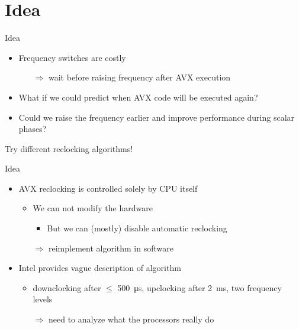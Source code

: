 \section{Idea}
\begin{frame}[t]{Idea}
	\begin{itemize}
		\item Frequency switches are costly
		\begin{itemize}
			\item[$\Rightarrow$] wait before raising frequency after AVX execution
		\end{itemize}
		\pause
		\item What if we could predict when AVX code will be executed again?
		\item Could we raise the frequency earlier and improve performance during scalar phases?
	\end{itemize}
	\pause
	\begin{center}
		\vspace{1em}
		Try different reclocking algorithms!
	\end{center}
\end{frame}

\begin{frame}[t]{Idea}
	\begin{itemize}
		\item AVX reclocking is controlled solely by CPU itself
		\begin{itemize}
			\item We can not modify the hardware
			\begin{itemize}
				\item But we can (mostly) disable automatic reclocking
			\end{itemize}
			\item[$\Rightarrow$] reimplement algorithm in software
		\end{itemize}
		\pause
		\item Intel provides vague description of algorithm
		\begin{itemize}
			\item downclocking after $\leq$ \SI{500}{\micro\second}, upclocking after \SI{2}{\milli\second}, two frequency levels
			\item[$\Rightarrow$] need to analyze what the processors really do
		\end{itemize}
	\end{itemize}
\end{frame}